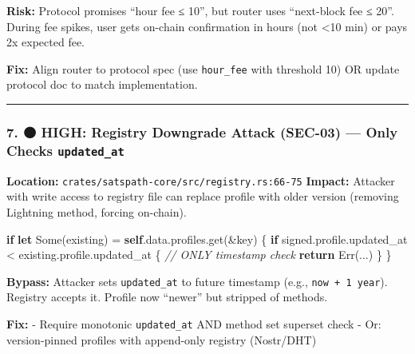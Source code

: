 \documentclass[
]{article}
\newenvironment{Shaded}{}{}
\newcommand{\CommentTok}[1]{\textcolor[rgb]{0.38,0.63,0.69}{\textit{#1}}}
\newcommand{\ConstantTok}[1]{\textcolor[rgb]{0.53,0.00,0.00}{#1}}
\newcommand{\ControlFlowTok}[1]{\textcolor[rgb]{0.00,0.44,0.13}{\textbf{#1}}}
\newcommand{\KeywordTok}[1]{\textcolor[rgb]{0.00,0.44,0.13}{\textbf{#1}}}
\newcommand{\NormalTok}[1]{#1}
\newcommand{\OperatorTok}[1]{\textcolor[rgb]{0.40,0.40,0.40}{#1}}
\begin{document}
\textbf{Risk:} Protocol promises ``hour fee ≤ 10'', but router uses
``next-block fee ≤ 20''. During fee spikes, user gets on-chain
confirmation in hours (not \textless10 min) or pays 2x expected fee.

\textbf{Fix:} Align router to protocol spec (use \texttt{hour\_fee} with
threshold 10) OR update protocol doc to match implementation.

\begin{center}\rule{0.5\linewidth}{0.5pt}\end{center}

\hypertarget{high-registry-downgrade-attack-sec-03-only-checks-updated_at}{%
\subsubsection{\texorpdfstring{7. 🟠 HIGH: Registry Downgrade Attack
(SEC-03) --- Only Checks
\texttt{updated\_at}}{7. 🟠 HIGH: Registry Downgrade Attack (SEC-03) --- Only Checks updated\_at}}\label{high-registry-downgrade-attack-sec-03-only-checks-updated_at}}

\textbf{Location:} \texttt{crates/satspath-core/src/registry.rs:66-75}
\textbf{Impact:} Attacker with write access to registry file can replace
profile with older version (removing Lightning method, forcing
on-chain).

\begin{Shaded}
\begin{Highlighting}[]
\ControlFlowTok{if} \KeywordTok{let} \ConstantTok{Some}\NormalTok{(existing) }\OperatorTok{=} \KeywordTok{self}\OperatorTok{.}\NormalTok{data}\OperatorTok{.}\NormalTok{profiles}\OperatorTok{.}\NormalTok{get(}\OperatorTok{\&}\NormalTok{key) }\OperatorTok{\{}
    \ControlFlowTok{if}\NormalTok{ signed}\OperatorTok{.}\NormalTok{profile}\OperatorTok{.}\NormalTok{updated\_at }\OperatorTok{\textless{}}\NormalTok{ existing}\OperatorTok{.}\NormalTok{profile}\OperatorTok{.}\NormalTok{updated\_at }\OperatorTok{\{}  \CommentTok{// ONLY timestamp check}
        \ControlFlowTok{return} \ConstantTok{Err}\NormalTok{(}\OperatorTok{...}\NormalTok{)}
    \OperatorTok{\}}
\OperatorTok{\}}
\end{Highlighting}
\end{Shaded}

\textbf{Bypass:} Attacker sets \texttt{updated\_at} to future timestamp
(e.g., \texttt{now\ +\ 1\ year}). Registry accepts it. Profile now
``newer'' but stripped of methods.

\textbf{Fix:} - Require monotonic \texttt{updated\_at} AND method set
superset check - Or: version-pinned profiles with append-only registry
(Nostr/DHT)
\end{document}

